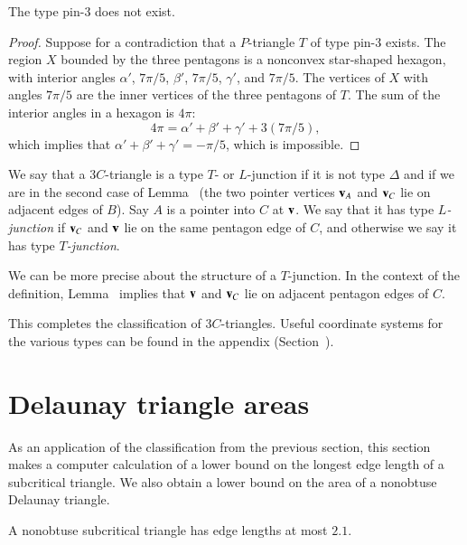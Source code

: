 \begin{lemma}  The type pin-$3$ does not exist.  
\end{lemma}

\begin{proof} Suppose for a contradiction that a $P$-triangle $T$ of
  type pin-$3$ exists.  The region $X$ bounded by the three pentagons
  is a nonconvex star-shaped hexagon, with interior angles $\alpha'$,
  $7\pi/5$, $\beta'$, $7\pi/5$, $\gamma'$, and $7\pi/5$.  The vertices
  of $X$ with angles $7\pi/5$ are the inner vertices of the three
  pentagons of $T$.  The sum of the interior angles in a hexagon is $4\pi$:
\[
4\pi = \alpha'+\beta'+\gamma' + 3 (7\pi/5),
\]
which implies that $\alpha'+\beta'+\gamma' = -\pi/5$, which is
impossible.
\end{proof}

\begin{definition}
  We say that a $3C$-triangle is a type $T$- or $L$-junction if it is
  not type $\Delta$ and if we are in the second case of
  Lemma~ (the two pointer vertices ${\mathbf v}_A$ and ${\mathbf v}_C$
  lie on adjacent edges of $B$).  Say $A$ is a pointer into $C$ at
  ${\mathbf v}$.  We say that it has type {\it $L$-junction} if ${\mathbf v}_C$ and ${\mathbf v}$
  lie on the same pentagon edge of $C$, and otherwise we say it has
  type {\it $T$-junction}.
\end{definition}

We can be more precise about the structure of a $T$-junction.  In the
context of the definition, Lemma~ implies that ${\mathbf v}$
and ${\mathbf v}_C$ lie on adjacent pentagon edges of $C$.

This completes the classification of $3C$-triangles.  Useful
coordinate systems for the various types can be found in the appendix
(Section~).

\section{Delaunay triangle areas}

As an application of the classification from the previous section,
this section makes a computer calculation of a lower bound on the
longest edge length of a subcritical triangle.  We also obtain a lower
bound on the area of a nonobtuse Delaunay triangle.



\begin{lemma} A nonobtuse subcritical triangle has edge lengths
  at most $2.1$.
\end{lemma}

